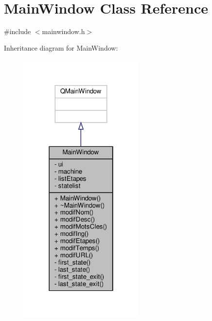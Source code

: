 \hypertarget{classMainWindow}{}\section{Main\+Window Class Reference}
\label{classMainWindow}


{\ttfamily \#include $<$mainwindow.\+h$>$}



Inheritance diagram for Main\+Window\+:
\nopagebreak
\begin{figure}[H]
\begin{center}
\leavevmode
\includegraphics[width=178pt]{classMainWindow__inherit__graph}
\end{center}
\end{figure}


